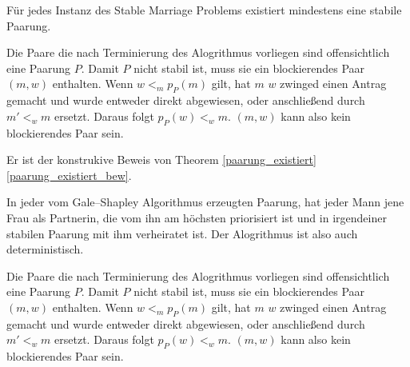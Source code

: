 \begin{Theorem}
\label{paarung_existiert}
  Für jedes Instanz des Stable Marriage Problems existiert mindestens eine stabile Paarung.
\end{Theorem}

\begin{Beweis}
\label{paarung_existiert_bew}
  Die Paare die nach Terminierung des Alogrithmus vorliegen sind offensichtlich eine Paarung $P$. Damit $P$ nicht stabil ist, muss sie ein blockierendes Paar $(m,w)$ enthalten. Wenn $w <_{m} p_{P}(m)$ gilt, hat $m$ $w$ zwinged einen Antrag gemacht und wurde entweder direkt abgewiesen, oder anschließend durch $m' <_{w} m$ ersetzt. Daraus folgt $p_{P}(w) <_{w} m$. $(m,w)$ kann also kein blockierendes Paar sein.
\end{Beweis}

Er ist der konstrukive Beweis von Theorem \ref{paarung_existiert} \ref{paarung_existiert_bew}.

\begin{Theorem}
\label{mann_optimal}
  In jeder vom Gale–Shapley Algorithmus erzeugten Paarung, hat jeder Mann jene Frau als Partnerin, die vom ihn am höchsten priorisiert ist und in irgendeiner stabilen Paarung mit ihm verheiratet ist. Der Alogrithmus ist also auch deterministisch.
\end{Theorem}

\begin{Beweis}
\label{mann_optimal_bew}
  Die Paare die nach Terminierung des Alogrithmus vorliegen sind offensichtlich eine Paarung $P$. Damit $P$ nicht stabil ist, muss sie ein blockierendes Paar $(m,w)$ enthalten. Wenn $w <_{m} p_{P}(m)$ gilt, hat $m$ $w$ zwinged einen Antrag gemacht und wurde entweder direkt abgewiesen, oder anschließend durch $m' <_{w} m$ ersetzt. Daraus folgt $p_{P}(w) <_{w} m$. $(m,w)$ kann also kein blockierendes Paar sein.
\end{Beweis}
